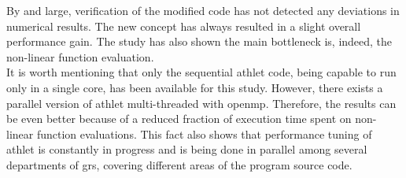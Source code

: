 By and large, verification of the modified code has not detected any deviations in numerical results. The new concept has always resulted in a slight overall performance gain. The study has also shown the main bottleneck is, indeed, the non-linear function evaluation.\\


It is worth mentioning that only the sequential \acrshort{athlet} code, being capable to run only in a single core, has been available for this study. However, there exists a parallel version of \acrshort{athlet} multi-threaded with \acrshort{openmp}. Therefore, the results can be even better because of a reduced fraction of execution time spent on non-linear function evaluations. This fact also shows that performance tuning of \acrshort{athlet} is constantly in progress and is being done in parallel among several departments of \acrshort{grs}, covering different areas of the program source code.\\


